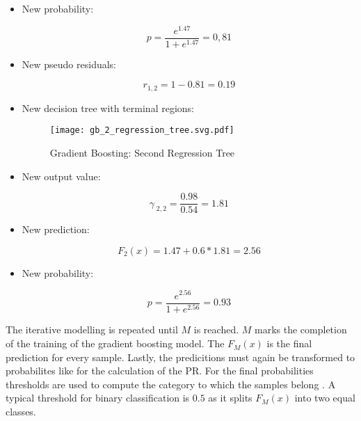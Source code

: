 \begin{itemize}

    \item New probability:

    \begin{equation*}
        p = \frac{e^{1.47}}{1 + e^{1.47}} = 0,81
    \end{equation*}

    \item New pseudo residuals: 

    \begin{equation*}
        r_{1, 2} = 1 - 0.81 = 0.19
    \end{equation*}
    
    \item New decision tree with terminal regions:

    \begin{figure}[H]
        \centering
        \caption[]{Gradient Boosting: Second Regression Tree}
        \label{gb_2_regression_tree}
        \texttt{[image: gb\_2\_regression\_tree.svg.pdf]}
    \end{figure}

    \item New output value: 

    \begin{equation*}
        \gamma_{\;2,2} = \frac{0.98}{0.54} = 1.81 
    \end{equation*}

    \item New prediction:

    \begin{equation*}
        F_{2}(x) = 1.47 + 0.6 * 1.81 = 2.56
    \end{equation*}

    \item New probability:

    \begin{equation*}
        p = \frac{e^{2.56}}{1 + e^{2.56}} = 0.93 
    \end{equation*}

\end{itemize}

The iterative modelling is repeated until \(M\) is reached. \(M\) marks the completion of the training of the gradient 
boosting model. The \(F_{M}(x)\) is the final prediction for every sample. Lastly, the predicitions
must again be transformed to probabilites like for the calculation of the \ac{PR}. For the final probabilities 
thresholds are used to compute the category to which the samples belong \cite[p.1204]{Friedman_2001}. A typical threshold 
for binary classification is \(0.5\) as it splits \(F_{M}(x)\) into two equal classes.

